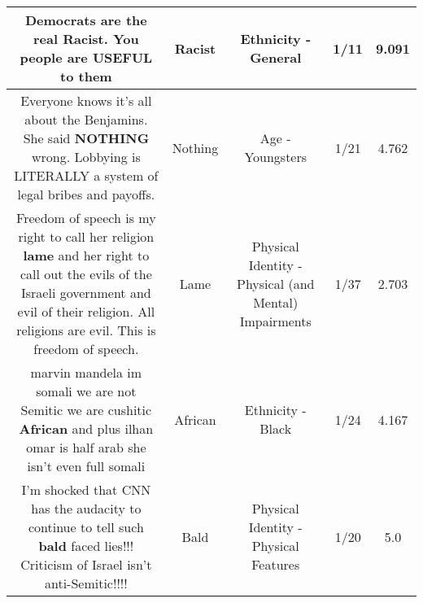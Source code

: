 \documentclass[11pt]{article}
\newlength\mylength
\begin{document}
\begin{center}
\begin{longtable}{|C{.65\mylength}|C{.30\mylength}|C{.12\mylength}|C{.12\mylength}|C{.12\mylength}|}
  \small Democrats are the real \textbf{Racist}. You people are USEFUL to them\normalsize   & Racist & Ethnicity - General & 1/11 & 9.091 \\  \hline
  \small Everyone knows it's all about the Benjamins. She said \textbf{NOTHING} wrong. Lobbying is LITERALLY a system of legal bribes and payoffs.\normalsize   & Nothing & Age - Youngsters & 1/21 & 4.762 \\  \hline
  \small Freedom of speech is my right to call her religion \textbf{lame} and her right to call out the evils of the Israeli government and evil of their religion. All religions are evil. This is freedom of speech.\normalsize   & Lame & Physical Identity - Physical (and Mental) Impairments & 1/37 & 2.703 \\  \hline
  \small marvin mandela im somali we are not Semitic we are cushitic \textbf{African} and plus ilhan omar is half arab she isn't even full somali\normalsize   & African & Ethnicity - Black & 1/24 & 4.167 \\  \hline
  \small I'm shocked that CNN has the audacity to continue to tell such \textbf{bald} faced lies!!! Criticism of Israel isn't anti-Semitic!!!!\normalsize   & Bald & Physical Identity - Physical Features & 1/20 & 5.0 \\  \hline

\end{longtable}
\end{center}
\end{document}
